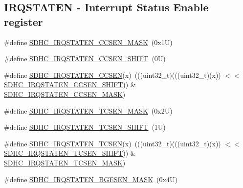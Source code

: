 \subsection*{I\+R\+Q\+S\+T\+A\+T\+EN -\/ Interrupt Status Enable register}
\begin{DoxyCompactItemize}
\item 
\#define \mbox{\hyperlink{group___s_d_h_c___register___masks_ga1ab5a76edc7d9d1b3458f6e111a47d29}{S\+D\+H\+C\+\_\+\+I\+R\+Q\+S\+T\+A\+T\+E\+N\+\_\+\+C\+C\+S\+E\+N\+\_\+\+M\+A\+SK}}~(0x1\+U)
\item 
\#define \mbox{\hyperlink{group___s_d_h_c___register___masks_gadbf850c08e3d0acfe9d03da53ac61b52}{S\+D\+H\+C\+\_\+\+I\+R\+Q\+S\+T\+A\+T\+E\+N\+\_\+\+C\+C\+S\+E\+N\+\_\+\+S\+H\+I\+FT}}~(0\+U)
\item 
\#define \mbox{\hyperlink{group___s_d_h_c___register___masks_ga1b1c3cccb62c506f8439f1d129b054bc}{S\+D\+H\+C\+\_\+\+I\+R\+Q\+S\+T\+A\+T\+E\+N\+\_\+\+C\+C\+S\+EN}}(x)~(((uint32\+\_\+t)(((uint32\+\_\+t)(x)) $<$$<$ \mbox{\hyperlink{group___s_d_h_c___register___masks_gadbf850c08e3d0acfe9d03da53ac61b52}{S\+D\+H\+C\+\_\+\+I\+R\+Q\+S\+T\+A\+T\+E\+N\+\_\+\+C\+C\+S\+E\+N\+\_\+\+S\+H\+I\+FT}})) \& \mbox{\hyperlink{group___s_d_h_c___register___masks_ga1ab5a76edc7d9d1b3458f6e111a47d29}{S\+D\+H\+C\+\_\+\+I\+R\+Q\+S\+T\+A\+T\+E\+N\+\_\+\+C\+C\+S\+E\+N\+\_\+\+M\+A\+SK}})
\item 
\#define \mbox{\hyperlink{group___s_d_h_c___register___masks_gac97f75c248571976edfb322bda13864e}{S\+D\+H\+C\+\_\+\+I\+R\+Q\+S\+T\+A\+T\+E\+N\+\_\+\+T\+C\+S\+E\+N\+\_\+\+M\+A\+SK}}~(0x2\+U)
\item 
\#define \mbox{\hyperlink{group___s_d_h_c___register___masks_gae491cb6cce5060d01d37d180b32ac94c}{S\+D\+H\+C\+\_\+\+I\+R\+Q\+S\+T\+A\+T\+E\+N\+\_\+\+T\+C\+S\+E\+N\+\_\+\+S\+H\+I\+FT}}~(1\+U)
\item 
\#define \mbox{\hyperlink{group___s_d_h_c___register___masks_gab0506ddd74b4a1578b81f0eb0b7b3813}{S\+D\+H\+C\+\_\+\+I\+R\+Q\+S\+T\+A\+T\+E\+N\+\_\+\+T\+C\+S\+EN}}(x)~(((uint32\+\_\+t)(((uint32\+\_\+t)(x)) $<$$<$ \mbox{\hyperlink{group___s_d_h_c___register___masks_gae491cb6cce5060d01d37d180b32ac94c}{S\+D\+H\+C\+\_\+\+I\+R\+Q\+S\+T\+A\+T\+E\+N\+\_\+\+T\+C\+S\+E\+N\+\_\+\+S\+H\+I\+FT}})) \& \mbox{\hyperlink{group___s_d_h_c___register___masks_gac97f75c248571976edfb322bda13864e}{S\+D\+H\+C\+\_\+\+I\+R\+Q\+S\+T\+A\+T\+E\+N\+\_\+\+T\+C\+S\+E\+N\+\_\+\+M\+A\+SK}})
\item 
\#define \mbox{\hyperlink{group___s_d_h_c___register___masks_ga46d5c9b348b825831e0fb397ede43a9a}{S\+D\+H\+C\+\_\+\+I\+R\+Q\+S\+T\+A\+T\+E\+N\+\_\+\+B\+G\+E\+S\+E\+N\+\_\+\+M\+A\+SK}}~(0x4\+U)

\end{DoxyCompactItemize}
